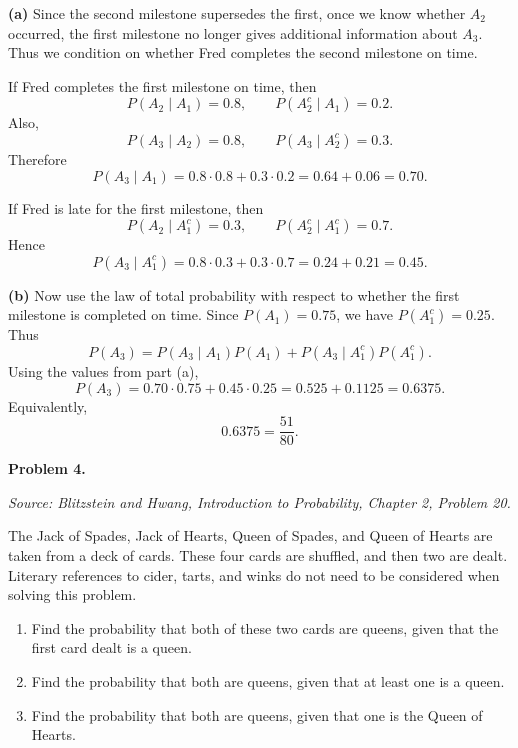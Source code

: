 \documentclass[11pt]{article}
\newcommand{\source}[1]{%
    \vspace{0.15cm}
    {\small\textit{Source: Blitzstein and Hwang, \textit{Introduction to Probability}, Chapter 2, Problem #1.}}
}
\begin{document}
\begin{solutionbox}
\textbf{(a)} Since the second milestone supersedes the first, once we know whether $A_2$ occurred, the first milestone no longer gives additional information about $A_3$. Thus we condition on whether Fred completes the second milestone on time.

If Fred completes the first milestone on time, then
\[
P(A_2\mid A_1)=0.8,
\qquad
P(A_2^c\mid A_1)=0.2.
\]
Also,
\[
P(A_3\mid A_2)=0.8,
\qquad
P(A_3\mid A_2^c)=0.3.
\]
Therefore
\[
P(A_3\mid A_1)
=
0.8\cdot 0.8+0.3\cdot 0.2
=
0.64+0.06
=
0.70.
\]

If Fred is late for the first milestone, then
\[
P(A_2\mid A_1^c)=0.3,
\qquad
P(A_2^c\mid A_1^c)=0.7.
\]
Hence
\[
P(A_3\mid A_1^c)
=
0.8\cdot 0.3+0.3\cdot 0.7
=
0.24+0.21
=
0.45.
\]


\textbf{(b)} Now use the law of total probability with respect to whether the first milestone is completed on time. Since $P(A_1)=0.75$, we have $P(A_1^c)=0.25$. Thus
\[
P(A_3)
=
P(A_3\mid A_1)P(A_1)+P(A_3\mid A_1^c)P(A_1^c).
\]
Using the values from part (a),
\[
P(A_3)
=
0.70\cdot 0.75+0.45\cdot 0.25
=
0.525+0.1125
=
0.6375.
\]
Equivalently,
\[
0.6375=\frac{51}{80}.
\]


\end{solutionbox}
\newpage


\begin{problemheader}
\textbf{Problem 4. }
\end{problemheader}
\source{20}

The Jack of Spades, Jack of Hearts, Queen of Spades, and Queen of Hearts are taken from a deck of cards. These four cards are shuffled, and then two are dealt. Literary references to cider, tarts, and winks do not need to be considered when solving this problem.

\begin{enumerate}[label=(\alph*), leftmargin=*]
    \item Find the probability that both of these two cards are queens, given that the first card dealt is a queen.

    \item Find the probability that both are queens, given that at least one is a queen.

    \item Find the probability that both are queens, given that one is the Queen of Hearts.
\end{enumerate}
\end{document}
